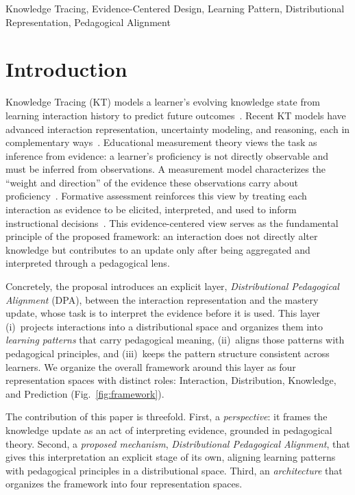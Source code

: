 \documentclass[conference]{IEEEtran}
\begin{document}
\begin{IEEEkeywords}
Knowledge Tracing, Evidence-Centered Design, Learning Pattern, Distributional Representation, Pedagogical Alignment
\end{IEEEkeywords}

\section{Introduction}
\label{sec:intro}

Knowledge Tracing (KT) models a learner's evolving knowledge state from learning interaction history to predict future outcomes~\cite{corbett1994kt, piech2015dkt}. Recent KT models have advanced interaction representation, uncertainty modeling, and reasoning, each in complementary ways~\cite{li2025mckt, xia2025cmdkt, chen2025ukt, li2025keenkt, wu2026sskt, nakagawa2019gkt, zhou2024psikt, hooshyar2026nskt, wu2026plkt}. Educational measurement theory views the task as inference from evidence: a learner's proficiency is not directly observable and must be inferred from observations. A measurement model characterizes the ``weight and direction'' of the evidence these observations carry about proficiency~\cite{mislevy2005ecd}. Formative assessment reinforces this view by treating each interaction as evidence to be elicited, interpreted, and used to inform instructional decisions~\cite{black2009formative}. This evidence-centered view serves as the fundamental principle of the proposed framework: an interaction does not directly alter knowledge but contributes to an update only after being aggregated and interpreted through a pedagogical lens.

Concretely, the proposal introduces an explicit layer, \emph{Distributional Pedagogical Alignment} (DPA), between the interaction representation and the mastery update, whose task is to interpret the evidence before it is used. This layer (i)~projects interactions into a distributional space and organizes them into \emph{learning patterns} that carry pedagogical meaning, (ii)~aligns those patterns with pedagogical principles, and (iii)~keeps the pattern structure consistent across learners. We organize the overall framework around this layer as four representation spaces with distinct roles: Interaction, Distribution, Knowledge, and Prediction (Fig.~\ref{fig:framework}).

The contribution of this paper is threefold. First, a \emph{perspective}: it frames the knowledge update as an act of interpreting evidence, grounded in pedagogical theory. Second, a \emph{proposed mechanism}, \emph{Distributional Pedagogical Alignment}, that gives this interpretation an explicit stage of its own, aligning learning patterns with pedagogical principles in a distributional space. Third, an \emph{architecture} that organizes the framework into four representation spaces.
\end{document}
